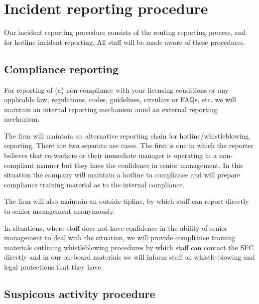 \section{Incident reporting procedure}

Our incident reporting procedure consists of the routing reporting
process, and for hotline incident reporting.  All staff will be
made aware of these procedures.

\subsection{Compliance reporting}

For reporting of (a) non-compliance with your licensing conditions or
any applicable law, regulations, codes, guidelines, circulars or
FAQs, etc. we will maintain an internal reporting mechanism annd an
external reporting mechanism.

The firm will maintain an alternative reporting chain for
hotline/whistleblowing reporting.  There are two separate use cases.
The first is one in which the reporter believes that co-workers or
their immediate manager is operating in a non-compliant manner but
they have the confidence in senior management.  In this situation the
company will maintain a hotline to compliance and will prepare
compliance training material as to the internal compliance.

The firm will also maintain an outside tipline, by which staff can
report directly to senior management anonymously.

In situations, where staff does not have confidence in the ability of
senior management to deal with the situation, we will provide
compliance training materials outlining whistleblowing procedures by
which staff can contact the SFC directly and in our on-board materials
we will inform staff on whistle-blowing and legal protections that
they have.

\subsection{Suspicous activity procedure}


